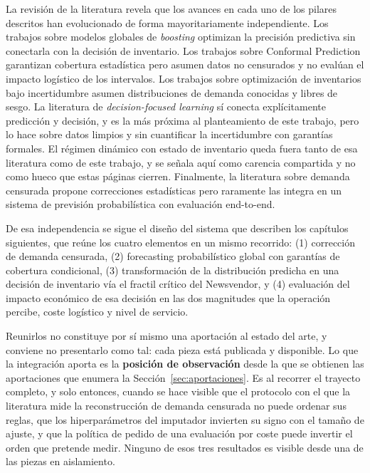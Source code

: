 La revisión de la literatura revela que los avances en cada uno de los pilares descritos han evolucionado de forma mayoritariamente independiente. Los trabajos sobre modelos globales de \textit{boosting} \cite{makridakis2022m5, ke2017lightgbm, prokhorenkova2018catboost} optimizan la precisión predictiva sin conectarla con la decisión de inventario. Los trabajos sobre Conformal Prediction \cite{angelopoulos2021gentle, xu2021conformal} garantizan cobertura estadística pero asumen datos no censurados y no evalúan el impacto logístico de los intervalos. Los trabajos sobre optimización de inventarios bajo incertidumbre \cite{silver1998inventory, ban2019big} asumen distribuciones de demanda conocidas y libres de sesgo. La literatura de \textit{decision-focused learning} \cite{bertsimas2020prescriptive, elmachtoub2022spo} sí conecta explícitamente predicción y decisión, y es la más próxima al planteamiento de este trabajo, pero lo hace sobre datos limpios y sin cuantificar la incertidumbre con garantías formales. El régimen dinámico con estado de inventario queda fuera tanto de esa literatura como de este trabajo, y se señala aquí como carencia compartida y no como hueco que estas páginas cierren. Finalmente, la literatura sobre demanda censurada \cite{musalem2010structural} propone correcciones estadísticas pero raramente las integra en un sistema de previsión probabilística con evaluación end-to-end.

De esa independencia se sigue el diseño del sistema que describen los capítulos siguientes, que reúne los cuatro elementos en un mismo recorrido: (1) corrección de demanda censurada, (2) forecasting probabilístico global con garantías de cobertura condicional, (3) transformación de la distribución predicha en una decisión de inventario vía el fractil crítico del Newsvendor, y (4) evaluación del impacto económico de esa decisión en las dos magnitudes que la operación percibe, coste logístico y nivel de servicio.

Reunirlos no constituye por sí mismo una aportación al estado del arte, y conviene no presentarlo como tal: cada pieza está publicada y disponible. Lo que la integración aporta es la \textbf{posición de observación} desde la que se obtienen las aportaciones que enumera la Sección~\ref{sec:aportaciones}. Es al recorrer el trayecto completo, y solo entonces, cuando se hace visible que el protocolo con el que la literatura mide la reconstrucción de demanda censurada no puede ordenar sus reglas, que los hiperparámetros del imputador invierten su signo con el tamaño de ajuste, y que la política de pedido de una evaluación por coste puede invertir el orden que pretende medir. Ninguno de esos tres resultados es visible desde una de las piezas en aislamiento.
